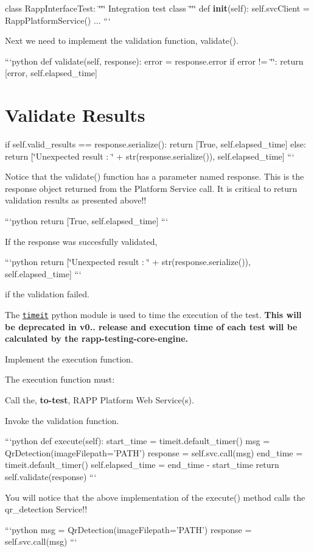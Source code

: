 class Rapp\-Interface\-Test\-: \char`\"{}\char`\"{}\char`\"{} Integration test class \char`\"{}\char`\"{}\char`\"{} def {\bfseries init}(self)\-: self.\-svc\-Client = Rapp\-Platform\-Service() ... ```

Next we need to implement the validation function, {\ttfamily validate()}.

```python def validate(self, response)\-: error = response.\-error if error != \char`\"{}\char`\"{}\-: return \mbox{[}error, self.\-elapsed\-\_\-time\mbox{]}

\section*{Validate Results}

if self.\-valid\-\_\-results == response.\-serialize()\-: return \mbox{[}True, self.\-elapsed\-\_\-time\mbox{]} else\-: return \mbox{[}\char`\"{}\-Unexpected result \-: \char`\"{} + str(response.\-serialize()), self.\-elapsed\-\_\-time\mbox{]} ```

Notice that the {\ttfamily validate()} function has a parameter named response. This is the response object returned from the Platform Service call. It is critical to return validation results as presented above!!

```python return \mbox{[}True, self.\-elapsed\-\_\-time\mbox{]} ```

If the response was succesfully validated,

```python return \mbox{[}\char`\"{}\-Unexpected result \-: \char`\"{} + str(response.\-serialize()), self.\-elapsed\-\_\-time\mbox{]} ```

if the validation failed.

The \href{https://docs.python.org/2/library/timeit.html}{\tt timeit} python module is used to time the execution of the test. {\bfseries This will be deprecated in v0.. release and execution time of each test will be calculated by the rapp-\/testing-\/core-\/engine.}

Implement the execution function.

The execution function must\-:


\begin{DoxyItemize}
\item Call the, {\bfseries to-\/test}, R\-A\-P\-P Platform Web Service(s).
\item Invoke the validation function.
\end{DoxyItemize}

```python def execute(self)\-: start\-\_\-time = timeit.\-default\-\_\-timer() msg = Qr\-Detection(image\-Filepath='P\-A\-T\-H') response = self.\-svc.\-call(msg) end\-\_\-time = timeit.\-default\-\_\-timer() self.\-elapsed\-\_\-time = end\-\_\-time -\/ start\-\_\-time return self.\-validate(response) ```

You will notice that the above implementation of the {\ttfamily execute()} method calls the qr\-\_\-detection Service!!

```python msg = Qr\-Detection(image\-Filepath='P\-A\-T\-H') response = self.\-svc.\-call(msg) ``` 
